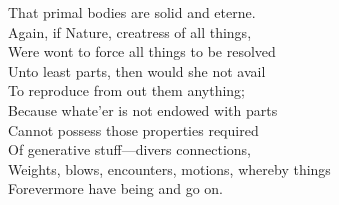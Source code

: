 That primal bodies are solid and eterne.\\
Again, if Nature, creatress of all things,\\
Were wont to force all things to be resolved\\
Unto least parts, then would she not avail\\
To reproduce from out them anything;\\
Because whate'er is not endowed with parts\\
Cannot possess those properties required\\
Of generative stuff—divers connections,\\
Weights, blows, encounters, motions, whereby things\\
Forevermore have being and go on.


